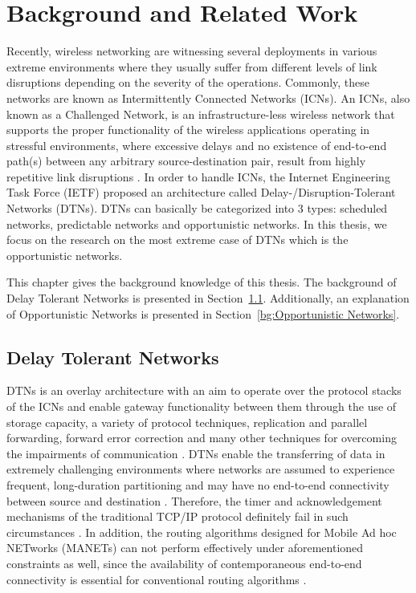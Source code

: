 \chapter{Background and Related Work}
\label{bg}

Recently, wireless networking are witnessing several deployments in various extreme environments where they usually suffer from different levels of link disruptions depending on the severity of the operations. 
Commonly, these networks are known as Intermittently Connected Networks (ICNs). 
An ICNs, also known as a Challenged Network, is an infrastructure-less wireless network that supports the proper functionality of the wireless applications operating in stressful environments, where excessive delays and no existence of end-to-end path(s) between any arbitrary source-destination pair, result from highly repetitive link disruptions \cite{Khabbaz2012}.
In order to handle ICNs, the Internet Engineering Task Force (IETF) \cite{Cerf2007} proposed an architecture called Delay-/Disruption-Tolerant Networks (DTNs).
DTNs can basically be categorized into 3 types: scheduled networks, predictable networks and opportunistic networks.
In this thesis, we focus on the research on the most extreme case of DTNs which is the opportunistic networks.

This chapter gives the background knowledge of this thesis. 
The background of Delay Tolerant Networks is presented in Section~\ref{bg:Delay Tolerant Networks}. 
Additionally, an explanation of Opportunistic Networks is presented in Section~\ref{bg:Opportunistic Networks}. 
\section{Delay Tolerant Networks}
\label{bg:Delay Tolerant Networks}
DTNs is an overlay architecture with an aim to operate over the protocol stacks of the ICNs and enable gateway functionality between them through the use of storage capacity, a variety of protocol techniques, replication and parallel forwarding, forward error correction and many other techniques for overcoming the impairments of communication  \cite{Khabbaz2012}.
DTNs enable the transferring of data in extremely challenging environments where networks are assumed to experience frequent, long-duration partitioning and may have no end-to-end connectivity between source and destination \cite{Liu2011}. 
Therefore, the timer and acknowledgement mechanisms of the traditional TCP/IP protocol definitely fail in such circumstances \cite{Souza2010}.
In addition, the routing algorithms designed for Mobile Ad hoc NETworks (MANETs) can not perform effectively under aforementioned constraints as well, since the availability of contemporaneous end-to-end connectivity is essential for conventional routing algorithms \cite{Yue2013}.

